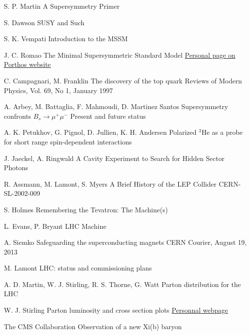 \begin{thebibliography}{2}
{S. P. Martin}
{A Supersymmetry Primer}
{}

{S. Dawson}
{SUSY and Such}
{}

{S. K. Vempati}
{Introduction to the MSSM}
{}

{J. C. Romao}
{The Minimal Supersymmetric Standard Model}
{\href{http://porthos.ist.utl.pt/~romao/homepage/publications/}{Personal page on Porthos website}}

{C. Campagnari, M. Franklin}
{The discovery of the top quark}
{Reviews of Modern Physics, Vol. 69, No 1, January 1997}

{A. Arbey, M. Battaglia, F. Mahmoudi, D. Martinez Santos}
{Supersymmetry confronts $B_s \rightarrow \mu^+ \mu^-$ Present and future status}
{}


{A. K. Petukhov, G. Pignol, D. Jullien, K. H. Andersen}
{Polarized $^3$He as a probe for short range spin-dependent interactions}
{}

{J. Jaeckel, A. Ringwald}
{A Cavity Experiment to Search for Hidden Sector Photons}
{}

{R. Assmann, M. Lamont, S. Myers}
{A Brief History of the LEP Collider}
{CERN-SL-2002-009}

{S. Holmes}
{Remembering the Tevatron: The Machine(s)}
{}

{L. Evans, P. Bryant}
{LHC Machine}
{}

{A. Siemko}
{Safeguarding the superconducting magnets}
{CERN Courier, August 19, 2013}

{M. Lamont}
{LHC: status and commissioning plans}
{}

{A. D. Martin, W. J. Stirling, R. S. Thorne, G. Watt}
{Parton distribution for the LHC}
{}

{W. J. Stirling}
{Parton luminosity and cross section plots}
{\href{http://www.hep.ph.ic.ac.uk/~wstirlin/plots/plots.html}{Personnal webpage}}

{The CMS Collaboration}
{Observation of a new Xi(b) baryon}
{}


\end{thebibliography}
